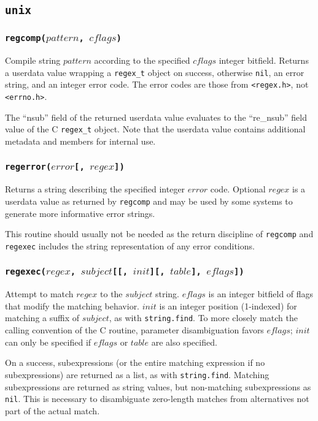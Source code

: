 \documentclass[11pt, oneside]{memoir}
\newcommand*{\nil}[0]{\texttt{nil}\xspace}
\newcommand*{\fn}[1]{\texttt{#1}\xspace}
\newcounter{toccols}
\newenvironment{Module}[1]{
	\subsection{\texttt{#1}}
	\addtocontents{toc}{
		\protect\begin{multicols}{\value{toccols}}
	}
}{
	\addtocontents{toc}{\protect\end{multicols}}
}
\begin{document}
\begin{Module}{unix}
\subsubsection[\fn{regcomp}]{\fn{regcomp($pattern$, $cflags$)}}

Compile string $pattern$ according to the specified $cflags$ integer bitfield. Returns a userdata value wrapping a \texttt{regex\_t} object on success, otherwise \nil, an error string, and an integer error code. The error codes are those from \texttt{<regex.h>}, not \texttt{<errno.h>}.

The ``nsub'' field of the returned userdata value evaluates to the ``re\_nsub'' field value of the C \texttt{regex\_t} object. Note that the userdata value contains additional metadata and members for internal use.

\subsubsection[\fn{regerror}]{\fn{regerror($error$[, $regex$])}}

Returns a string describing the specified integer $error$ code. Optional $regex$ is a userdata value as returned by \fn{regcomp} and may be used by some systems to generate more informative error strings.

This routine should usually not be needed as the return discipline of \fn{regcomp} and \fn{regexec} includes the string representation of any error conditions.

\subsubsection[\fn{regexec}]{\fn{regexec($regex$, $subject$[[, $init$][, $table$], $eflags$])}}

Attempt to match $regex$ to the $subject$ string. $eflags$ is an integer bitfield of flags that modify the matching behavior. $init$ is an integer position (1-indexed) for matching a suffix of $subject$, as with \fn{string.find}. To more closely match the calling convention of the C routine, parameter disambiguation favors $eflags$; $init$ can only be specified if $eflags$ or $table$ are also specified.

On a success, subexpressions (or the entire matching expression if no subexpressions) are returned as a list, as with \fn{string.find}. Matching subexpressions are returned as string values, but non-matching subexpressions as \nil. This is necessary to disambiguate zero-length matches from alternatives not part of the actual match.


\end{Module}
\end{document}
